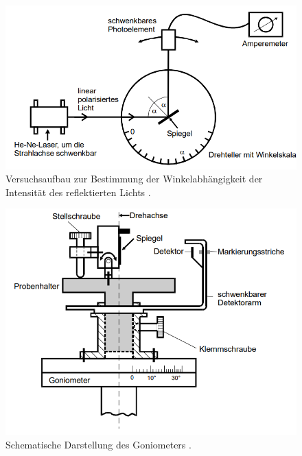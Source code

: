 \begin{figure}[H]
    \centering
    \includegraphics[scale=1]{content/Aufbau.png}
    \caption{Versuchsaufbau zur Bestimmung der Winkelabhängigkeit der Intensität des reflektierten Lichts \cite{sample}.}
    \label{fig:Aufbau}
\end{figure}
\begin{figure}[H]
    \centering
    \includegraphics[scale=1]{content/Goniometer.png}
    \caption{Schematische Darstellung des Goniometers \cite{sample}.}
    \label{fig:Gonio}
\end{figure}

